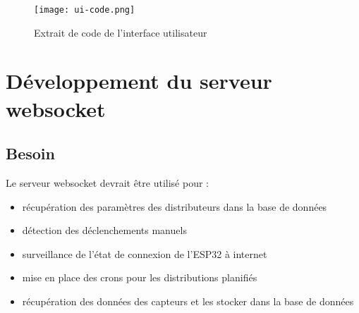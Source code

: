 	\begin{figure}[H]
   			\centering
   			\texttt{[image: ui-code.png]}
   			\caption{Extrait de code de l'interface utilisateur}
   			\label{fig:ui-code}
	\end{figure}
	
\section{Développement du serveur websocket}
\subsection{Besoin}
Le serveur websocket devrait être utilisé pour : 
\begin{itemize}
\item récupération des paramètres des distributeurs dans la base de données
\item détection des déclenchements manuels 
\item surveillance de l'état de connexion de l'ESP32 à internet
\item mise en place des crons pour les distributions planifiés
\item récupération des données des capteurs et les stocker dans la base de données
\end{itemize}

